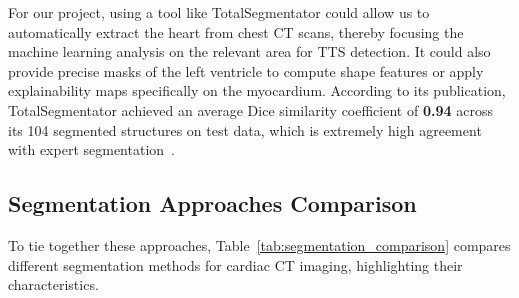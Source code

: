 \documentclass[12pt, BSc]{muthesis}
\begin{document}
For our project, using a tool like TotalSegmentator could allow us to automatically extract the heart from chest CT scans, thereby focusing the machine learning analysis on the relevant area for TTS detection. It could also provide precise masks of the left ventricle to compute shape features or apply explainability maps specifically on the myocardium. According to its publication, TotalSegmentator achieved an average Dice similarity coefficient of \textbf{0.94} across its 104 segmented structures on test data, which is extremely high agreement with expert segmentation~\cite{wasserthal2023totalsegmentator}.

\subsection{Segmentation Approaches Comparison}
To tie together these approaches, Table~\ref{tab:segmentation_comparison} compares different segmentation methods for cardiac CT imaging, highlighting their characteristics.
\end{document}
